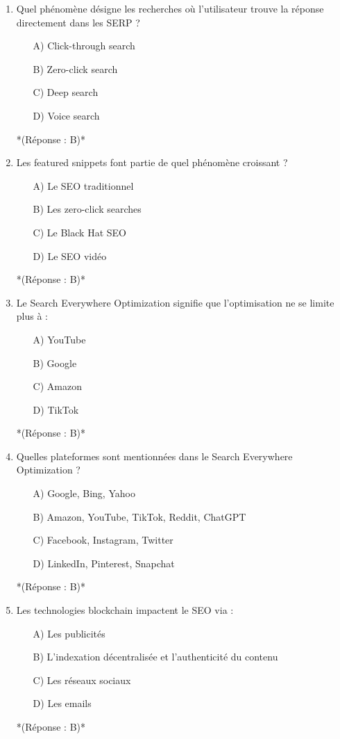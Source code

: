 \documentclass[12pt,a4paper,twoside]{report}
\begin{document}
\begin{enumerate}
    \item Quel phénomène désigne les recherches où l'utilisateur trouve la réponse directement dans les SERP ?
    \begin{itemize}
        \item[A)] Click-through search
        \item[B)] Zero-click search
        \item[C)] Deep search
        \item[D)] Voice search
    \end{itemize}
    *(Réponse : B)*

    \item Les featured snippets font partie de quel phénomène croissant ?
    \begin{itemize}
        \item[A)] Le SEO traditionnel
        \item[B)] Les zero-click searches
        \item[C)] Le Black Hat SEO
        \item[D)] Le SEO vidéo
    \end{itemize}
    *(Réponse : B)*

    \item Le Search Everywhere Optimization signifie que l'optimisation ne se limite plus à :
    \begin{itemize}
        \item[A)] YouTube
        \item[B)] Google
        \item[C)] Amazon
        \item[D)] TikTok
    \end{itemize}
    *(Réponse : B)*

    \item Quelles plateformes sont mentionnées dans le Search Everywhere Optimization ?
    \begin{itemize}
        \item[A)] Google, Bing, Yahoo
        \item[B)] Amazon, YouTube, TikTok, Reddit, ChatGPT
        \item[C)] Facebook, Instagram, Twitter
        \item[D)] LinkedIn, Pinterest, Snapchat
    \end{itemize}
    *(Réponse : B)*

    \item Les technologies blockchain impactent le SEO via :
    \begin{itemize}
        \item[A)] Les publicités
        \item[B)] L'indexation décentralisée et l'authenticité du contenu
        \item[C)] Les réseaux sociaux
        \item[D)] Les emails
    \end{itemize}
    *(Réponse : B)*


\end{enumerate}
\end{document}
